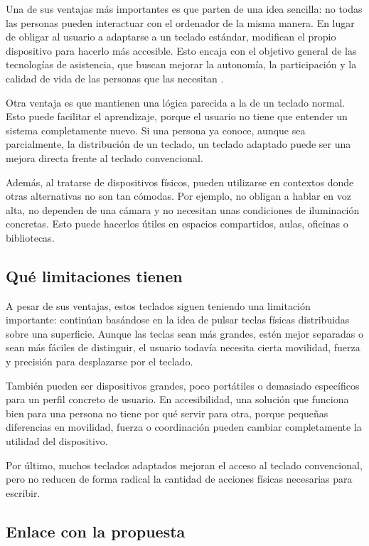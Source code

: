 Una de sus ventajas más importantes es que parten de una idea sencilla: no todas las personas pueden interactuar con el ordenador de la misma manera. En lugar de obligar al usuario a adaptarse a un teclado estándar, modifican el propio dispositivo para hacerlo más accesible. Esto encaja con el objetivo general de las tecnologías de asistencia, que buscan mejorar la autonomía, la participación y la calidad de vida de las personas que las necesitan \cite{whoAssistiveTechnology}.

Otra ventaja es que mantienen una lógica parecida a la de un teclado normal. Esto puede facilitar el aprendizaje, porque el usuario no tiene que entender un sistema completamente nuevo. Si una persona ya conoce, aunque sea parcialmente, la distribución de un teclado, un teclado adaptado puede ser una mejora directa frente al teclado convencional.

Además, al tratarse de dispositivos físicos, pueden utilizarse en contextos donde otras alternativas no son tan cómodas. Por ejemplo, no obligan a hablar en voz alta, no dependen de una cámara y no necesitan unas condiciones de iluminación concretas. Esto puede hacerlos útiles en espacios compartidos, aulas, oficinas o bibliotecas.

\subsection{Qué limitaciones tienen}

A pesar de sus ventajas, estos teclados siguen teniendo una limitación importante: continúan basándose en la idea de pulsar teclas físicas distribuidas sobre una superficie. Aunque las teclas sean más grandes, estén mejor separadas o sean más fáciles de distinguir, el usuario todavía necesita cierta movilidad, fuerza y precisión para desplazarse por el teclado.

También pueden ser dispositivos grandes, poco portátiles o demasiado específicos para un perfil concreto de usuario. En accesibilidad, una solución que funciona bien para una persona no tiene por qué servir para otra, porque pequeñas diferencias en movilidad, fuerza o coordinación pueden cambiar completamente la utilidad del dispositivo.

Por último, muchos teclados adaptados mejoran el acceso al teclado convencional, pero no reducen de forma radical la cantidad de acciones físicas necesarias para escribir.

\subsection{Enlace con la propuesta}


